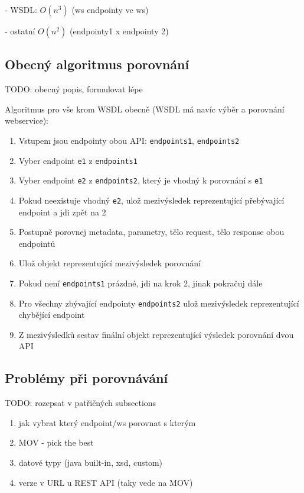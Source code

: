 \documentclass[czech,DP]{thesiskiv}
\begin{document}
	- WSDL: $O(n^3)$ (ws endpointy ve ws)
	
	- ostatní $O(n^2)$ (endpointy1 x endpointy 2)

\subsection{Obecný algoritmus porovnání}

TODO: obecný popis, formulovat lépe

Algoritmus pro vše krom WSDL obecně (WSDL má navíc výběr a porovnání webservice):
\begin{enumerate}
	\item Vstupem jsou endpointy obou API: \verb|endpoints1|, \verb|endpoints2|
	\item Vyber endpoint \verb|e1| z \verb|endpoints1|
	\item Vyber endpoint \verb|e2| z \verb|endpoints2|, který je vhodný k porovnání s \verb|e1|
	\item Pokud neexistuje vhodný \verb|e2|, ulož mezivýsledek reprezentující přebývající endpoint a jdi zpět na 2
	\item Postupně porovnej metadata, parametry, tělo request, tělo response obou endpointů
	\item Ulož objekt reprezentující mezivýsledek porovnání
	\item Pokud není \verb|endpoints1| prázdné, jdi na krok 2, jinak pokračuj dále
	\item Pro všechny zbývající endpointy \verb|endpoints2| ulož mezivýsledek reprezentující chybějící endpoint
	\item Z mezivýsledků sestav finální objekt reprezentující výsledek porovnání dvou API
\end{enumerate}

\subsection{Problémy při porovnávání}	

TODO: rozepsat v patřičných subsections
\begin{enumerate}
	\item jak vybrat který endpoint/ws porovnat s kterým
	\item MOV - pick the best
	\item datové typy (java built-in, xsd, custom)
	\item verze v URL u REST API (taky vede na MOV)
\end{enumerate}
	
\end{document}

